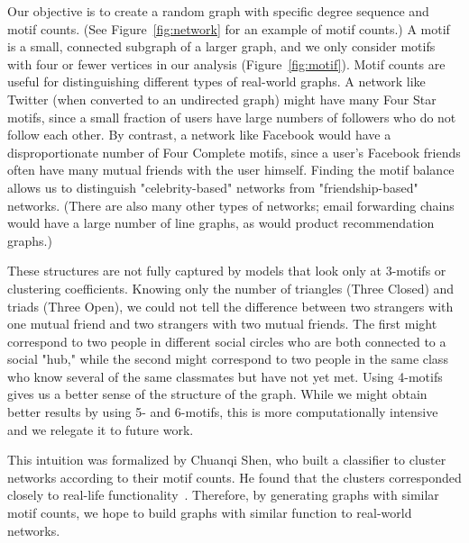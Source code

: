 Our objective is to create a random graph with specific degree sequence and
motif counts.  (See Figure~\ref{fig:network} for an example of motif
counts.)  A motif is a small, connected subgraph of a larger graph,
and we only consider motifs with four or fewer vertices in our analysis 
(Figure~\ref{fig:motif}).  Motif counts are useful for distinguishing different
types of real-world graphs.  A network like Twitter (when converted to an
undirected graph) might have many Four
Star motifs, since a small fraction of users have large numbers of
followers who do not follow each other.  By contrast, a network like
Facebook would have a disproportionate number of Four Complete motifs, 
since a user's Facebook friends often have many mutual friends with the
user himself.  Finding the motif balance allows us to distinguish
"celebrity-based" networks from "friendship-based" networks.  (There are
also many other types of networks; email forwarding chains would have a
large number of line graphs, as would product recommendation graphs.)

These structures are not fully captured by models that look only at
3-motifs or clustering coefficients.  Knowing only the number of triangles
(Three Closed) and triads (Three Open), we could not tell the difference
between two strangers with one mutual friend and two strangers with two
mutual friends.  The first might correspond to two people in different
social circles who are both connected to a social "hub," while the
second might correspond to two people in the same class who know
several of the same classmates but have not yet met.  Using 4-motifs gives
us a better sense of the structure of the graph.  While
we might obtain better results by using 5- and 6-motifs, this is more
computationally intensive and we relegate it to future work.

This intuition was formalized by Chuanqi Shen, who built a classifier to
cluster networks according to their motif counts.  He found that the
clusters corresponded closely to real-life functionality~\cite{chuanqi}.
Therefore, by generating graphs with similar motif counts, we hope to build 
graphs with similar function to real-world networks.


